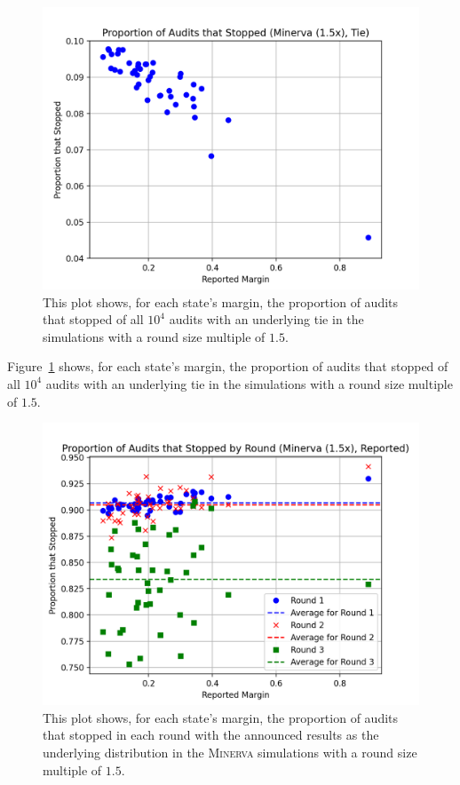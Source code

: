\documentclass[runningheads]{llncs}
\newcommand{\Minerva}{\textsc{Minerva}\xspace}
\begin{document}

\begin{figure}[H]
\includegraphics[width=\textwidth]{minerva_multiround_1p5x_10^4/total_risk.png}
\caption{This plot shows, for each state's margin, the proportion of audits that stopped of
all $10^4$ audits with an underlying tie in the simulations with a round size multiple of $1.5$.}
\label{fig:minerva1p5_risk}
\end{figure}

Figure~\ref{fig:minerva1p5_risk} shows, for each state's margin, the proportion of audits that stopped of
all $10^4$ audits with an underlying tie in the simulations with a round size multiple of $1.5$.

\begin{figure}[H]
\includegraphics[width=\textwidth]{minerva_multiround_1p5x_10^4/sprobs_first_three.png}
\caption{This plot shows, for each state's margin, the proportion of audits that stopped in each round
with the announced results as the underlying distribution
in the \Minerva simulations with a round size multiple of $1.5$.}
\label{fig:minerva1p5_sprob}
\end{figure}
\end{document}
